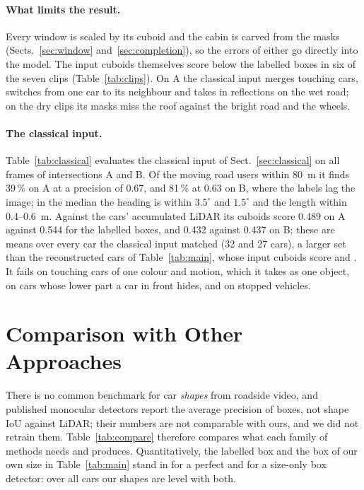 \documentclass[runningheads,a4paper]{llncs}
\begin{document}
\paragraph{What limits the result.} Every window is scaled by its cuboid and the cabin is carved from the masks
(Sects.~\ref{sec:window} and~\ref{sec:completion}), so the errors of either go directly into the model. The input
cuboids themselves score below the labelled boxes in six of the seven clips (Table~\ref{tab:clips}). On A the
classical input merges touching cars, switches from one car to its neighbour and takes in reflections on the wet
road; on the dry clips its masks miss the roof against the bright road and the wheels.

\paragraph{The classical input.} Table~\ref{tab:classical} evaluates the classical input of
Sect.~\ref{sec:classical} on all frames of intersections A and B. Of the moving road users within 80~m it finds
39\,\% on A at a precision of 0.67, and 81\,\% at 0.63 on B, where the labels lag the image; in the median the heading
is within $3.5^\circ$ and $1.5^\circ$ and the length within 0.4--0.6~m. Against the cars' accumulated LiDAR its cuboids score 0.489 on A against 0.544 for the labelled boxes, and 0.432 against 0.437 on B; these are means over every car the classical input matched (32 and 27 cars), a larger set than the reconstructed cars of Table~\ref{tab:main}, whose input cuboids score \ClsAInput{} and \ClsBInput{}. It fails on touching cars
of one colour and motion, which it takes as one object, on cars whose lower part a car in front hides, and on stopped
vehicles.



\section{Comparison with Other Approaches}\label{sec:comparison}

There is no common benchmark for car \emph{shapes} from roadside video, and published monocular detectors report the
average precision of boxes, not shape IoU against LiDAR; their numbers are not comparable with ours, and we did not
retrain them. Table~\ref{tab:compare} therefore compares what each family of methods needs and produces.
Quantitatively, the labelled box and the box of our own size in Table~\ref{tab:main} stand in for a perfect and for a
size-only box detector: over all cars our shapes are level with both.
\end{document}
